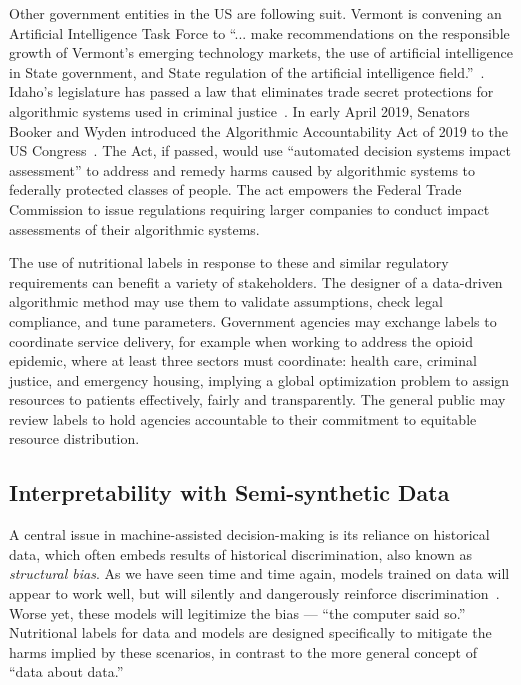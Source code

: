 Other government entities in the US are following suit.  Vermont is convening an Artificial Intelligence Task Force to ``... make recommendations on the responsible growth of Vermont’s emerging technology markets, the use of artificial intelligence in State government, and State regulation of the artificial intelligence field.''~\cite{Vermont}.  Idaho’s legislature has passed a law that eliminates trade secret protections for algorithmic systems used in criminal justice~\cite{Idaho}.  In early April 2019, Senators Booker and Wyden introduced the Algorithmic Accountability Act of 2019 to the US Congress~\cite{BookerWydenClarke}. The Act, if passed, would use ``automated decision systems impact assessment'' to address and remedy harms caused by algorithmic systems to federally protected classes of people. The act empowers the Federal Trade Commission to issue regulations requiring larger companies to conduct impact assessments of their algorithmic systems.

The use of nutritional labels in response to these and similar regulatory requirements can benefit a variety of stakeholders.  The designer of a data-driven algorithmic method may use them to validate assumptions, check legal compliance, and tune parameters.  Government agencies may exchange labels to coordinate service delivery, for example when working to address the opioid epidemic, where  at least three sectors must coordinate: health care, criminal justice, and emergency housing, implying a global optimization problem to assign resources to patients effectively, fairly and transparently. The general public may review labels to hold agencies accountable to their commitment to equitable resource distribution. 


\subsection{Interpretability with Semi-synthetic Data}
\label{sec:intro:synth}


A central issue in machine-assisted decision-making is its reliance on historical data, which often embeds results of historical discrimination, also known as {\em structural bias}.   As we have seen time and time again, models trained on data will appear to work well, but will silently and dangerously reinforce discrimination~\cite{propublicaJ,amazon_hiring,amazon_delivery}.  Worse yet, these models will legitimize the bias --- ``the computer said so.''  Nutritional labels for data and models are designed specifically to mitigate the harms implied by these scenarios, in contrast to the more general concept of ``data about data.''

